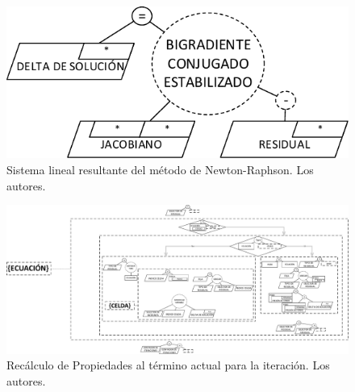 \begin{figure}[h]
	\centering%
	\includegraphics[scale=1]{Fig/SistemaLineal.pdf}%
	\caption[Sistema lineal resultante del método de Newton-Raphson.]{Sistema lineal resultante del método de Newton-Raphson. Los autores.} \label{fig:LinearSystem}
\end{figure}

\begin{figure}[h]
	\centering%
	\includegraphics[width=\linewidth]{Fig/ActualizacionDeIncognitas.pdf}%
	\caption[Recálculo de Propiedades al término actual para la iteración.]{Recálculo de Propiedades al término actual para la iteración. Los autores.} \label{fig:UpdateVariables}
\end{figure}


